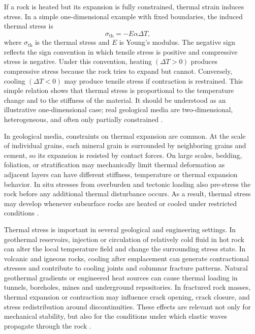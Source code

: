 If a rock is heated but its expansion is fully constrained, thermal strain induces stress. In a simple one-dimensional example with fixed boundaries, the induced thermal stress is
\begin{equation}
\sigma_{\mathrm{th}} = -E\alpha\Delta T,
\end{equation}
where \(\sigma_{\mathrm{th}}\) is the thermal stress and \(E\) is Young's modulus. The negative sign reflects the sign convention in which tensile stress is positive and compressive stress is negative. Under this convention, heating \((\Delta T > 0)\) produces compressive stress because the rock tries to expand but cannot. Conversely, cooling \((\Delta T < 0)\) may produce tensile stress if contraction is restrained. This simple relation shows that thermal stress is proportional to the temperature change and to the stiffness of the material. It should be understood as an illustrative one-dimensional case; real geological media are two-dimensional, heterogeneous, and often only partially constrained \cite{boley1960,jaeger2007}.

In geological media, constraints on thermal expansion are common. At the scale of individual grains, each mineral grain is surrounded by neighboring grains and cement, so its expansion is resisted by contact forces. On large scales, bedding, foliation, or stratification may mechanically limit thermal deformation as adjacent layers can have different stiffness, temperature or thermal expansion behavior. In situ stresses from overburden and tectonic loading also pre-stress the rock before any additional thermal disturbance occurs. As a result, thermal stress may develop whenever subsurface rocks are heated or cooled under restricted conditions \cite{jaeger2007,turcotte2014}.

Thermal stress is important in several geological and engineering settings. In geothermal reservoirs, injection or circulation of relatively cold fluid in hot rock can alter the local temperature field and change the surrounding stress state. In volcanic and igneous rocks, cooling after emplacement can generate contractional stresses and contribute to cooling joints and columnar fracture patterns. Natural geothermal gradients or engineered heat sources can cause thermal loading in tunnels, boreholes, mines and underground repositories. In fractured rock masses, thermal expansion or contraction may influence crack opening, crack closure, and stress redistribution around discontinuities. These effects are relevant not only for mechanical stability, but also for the conditions under which elastic waves propagate through the rock \cite{robertson1988,turcotte2014,jaeger2007}.

